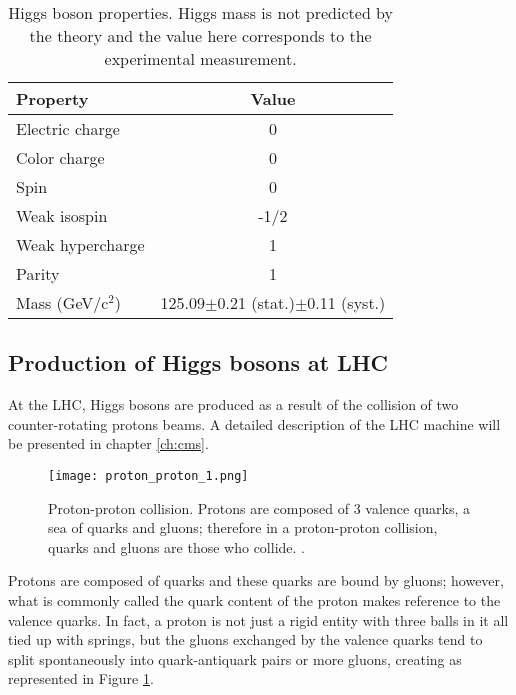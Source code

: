 \begin{table}[h]
\centering
\scriptsize
\begin{tabular}{lc}\hline
Property         & Value  \\ \hline
Electric charge  & 0      \\
Color charge    & 0      \\
Spin             & 0      \\
Weak isospin     & -1/2    \\
Weak hypercharge & 1      \\
Parity           & 1      \\\hline
Mass (GeV/c$^2$) & 125.09$\pm$0.21 (stat.)$\pm$0.11 (syst.)\\\hline
\end{tabular}
\caption[Higgs boson properties.]{Higgs boson properties. Higgs mass is not predicted by the theory and the value here corresponds to the experimental measurement.}\label{higgs_prop}
\end{table}


\subsection{Production of Higgs bosons at LHC}

At the LHC, Higgs bosons are produced as a result of the collision of two counter-rotating protons beams. A detailed description of the LHC machine will be presented in chapter \ref{ch:cms}.%
\begin{figure}[!h]
\centering
\texttt{[image: proton\_proton\_1.png]}
\caption[Proton-Proton collision]{Proton-proton collision. Protons are composed of 3 valence quarks, a sea of quarks and gluons; therefore in a proton-proton collision, quarks and gluons are those who collide. \cite{pp_coll}.}
\label{pp_collision}
\end{figure}

Protons are composed of quarks and these quarks are bound by gluons; however, what is commonly called the quark content of the proton makes reference to the valence quarks. In fact, a proton is not just a rigid entity with three balls in it all tied up with springs, but the gluons exchanged by the valence quarks tend to split spontaneously into quark-antiquark pairs or more gluons, creating  as represented in Figure \ref{pp_collision}.

